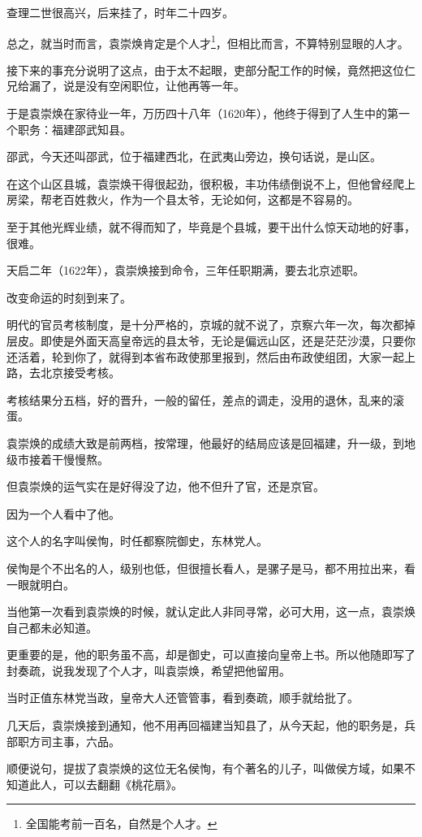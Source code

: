 \begin{multicols}{\theparacolNo}
		查理二世很高兴，后来挂了，时年二十四岁。

		总之，就当时而言，袁崇焕肯定是个人才\footnote{全国能考前一百名，自然是个人才。}，但相比而言，不算特别显眼的人才。

		接下来的事充分说明了这点，由于太不起眼，吏部分配工作的时候，竟然把这位仁兄给漏了，说是没有空闲职位，让他再等一年。

		于是袁崇焕在家待业一年，万历四十八年（1620年），他终于得到了人生中的第一个职务：福建邵武知县。

		邵武，今天还叫邵武，位于福建西北，在武夷山旁边，换句话说，是山区。

		在这个山区县城，袁崇焕干得很起劲，很积极，丰功伟绩倒说不上，但他曾经爬上房梁，帮老百姓救火，作为一个县太爷，无论如何，这都是不容易的。

		至于其他光辉业绩，就不得而知了，毕竟是个县城，要干出什么惊天动地的好事，很难。

		天启二年（1622年），袁崇焕接到命令，三年任职期满，要去北京述职。

		改变命运的时刻到来了。

		明代的官员考核制度，是十分严格的，京城的就不说了，京察六年一次，每次都掉层皮。即使是外面天高皇帝远的县太爷，无论是偏远山区，还是茫茫沙漠，只要你还活着，轮到你了，就得到本省布政使那里报到，然后由布政使组团，大家一起上路，去北京接受考核。

		考核结果分五档，好的晋升，一般的留任，差点的调走，没用的退休，乱来的滚蛋。

		袁崇焕的成绩大致是前两档，按常理，他最好的结局应该是回福建，升一级，到地级市接着干慢慢熬。

		但袁崇焕的运气实在是好得没了边，他不但升了官，还是京官。

		因为一个人看中了他。

		这个人的名字叫侯恂，时任都察院御史，东林党人。

		侯恂是个不出名的人，级别也低，但很擅长看人，是骡子是马，都不用拉出来，看一眼就明白。

		当他第一次看到袁崇焕的时候，就认定此人非同寻常，必可大用，这一点，袁崇焕自己都未必知道。

		更重要的是，他的职务虽不高，却是御史，可以直接向皇帝上书。所以他随即写了封奏疏，说我发现了个人才，叫袁崇焕，希望把他留用。

		当时正值东林党当政，皇帝大人还管管事，看到奏疏，顺手就给批了。

		几天后，袁崇焕接到通知，他不用再回福建当知县了，从今天起，他的职务是，兵部职方司主事，六品。

		顺便说句，提拔了袁崇焕的这位无名侯恂，有个著名的儿子，叫做侯方域，如果不知道此人，可以去翻翻《桃花扇》。


\end{multicols}

